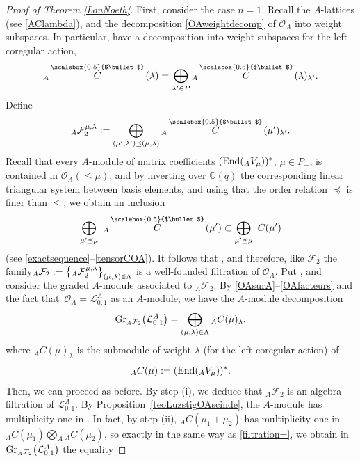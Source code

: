 \documentclass[pdftex]{sigma}
\numberwithin{equation}{section}
\theoremstyle{definition}
\newcommand{\mc}{\mathbb{C}}
\newcommand{\Ll}{{\mathcal L}}
\newcommand{\Oo}{{\mathcal O}}
\newcommand{\smallbullet}{%
\vcenter{\hbox{\,\scalebox{0.5}{$\bullet$}\,}}
}
\begin{document}
\begin{proof}[Proof of Theorem \ref{LonNoeth}]
First, consider the case $n=1$. Recall the $A$-lattices \smash{${}_A \overset{\raisebox{-1.5pt}{\scriptsize$\smallbullet$}}{C} (\lambda)$} (see \eqref{AClambda}), and the decomposition \eqref{OAweightdecomp} of $\Oo_A$ into weight subspaces. In particular, have a decomposition into weight subspaces for the left coregular action,
\[{}_A \overset{\raisebox{-1.5pt}{\scriptsize$\smallbullet$}}{C} (\lambda) = \bigoplus_{\lambda'\in P} {}_A \overset{\raisebox{-1.5pt}{\scriptsize$\smallbullet$}}{C} (\lambda)_{\lambda'}.\]
Define
\[{}_A\mathcal{F}_2^{\mu,\lambda} := \bigoplus_{(\mu',\lambda')\preceq (\mu,\lambda)} {}_A \overset{\raisebox{-1.5pt}{\scriptsize$\smallbullet$}}{C} (\mu')_{\lambda'}.\]
Recall that every $A$-module of matrix coefficients $({\rm End}({}_A V_\mu))^*$, $\mu\in P_+$, is contained in $\Oo_A(\leq \mu)$, and by inverting over $\mc(q)$ the corresponding linear triangular system between basis elements, and using that the order relation $\preceq$ is finer than $\leq$, we obtain an inclusion
\[
 \bigoplus_{\mu'\preceq \mu}\ {}_A \overset{\raisebox{-1.5pt}{\scriptsize$\smallbullet$}}{C} (\mu') \subset \bigoplus_{\mu'\preceq \mu} \ C(\mu')
\]
 (see \eqref{exactsequence}--\eqref{tensorCOA}). It follows that \smash{${}_A\mathcal{F}_2^{\mu,\lambda} = \mathcal{F}_2^{\mu,\lambda} \cap \Oo_A$}, and therefore, like $\mathcal{F}_2$ the family${}_A\mathcal{F}_2 :=\smash{\big\{{}_A\mathcal{F}_2^{\mu,\lambda}\big\}_{(\mu,\lambda)\in \Lambda}}$ is a well-founded filtration of $\Oo_A$. Put \smash{${}_A\mathcal{F}_2^{\prec \mu,\lambda} = \mathcal{F}_2^{\prec \mu,\lambda} \cap \Oo_A$}, and consider the graded $A$-module  associated to ${}_A\mathcal{F}_2$. By \eqref{OAsurA}--\eqref{OAfacteurs} and the fact that~${\Oo_A=\Ll_{0,1}^A}$ as an $A$-module, we have the $A$-module decomposition
\[{\rm Gr}_{ {}_A\mathcal{F}_2}\big({\mathcal L}_{0,1}^A\big)=\bigoplus_{(\mu,\lambda)\in \Lambda} {}_AC(\mu)_\lambda,\]
where ${}_AC(\mu)_\lambda$ is the submodule of weight $\lambda$ (for the left coregular action) of
\[{}_AC(\mu) := \left({\rm End}({}_A V_\mu\right))^*.\]
Then, we can proceed as before. By step (i), we deduce that ${}_A\mathcal{F}_2$ is an algebra filtration of $\Ll_{0,1}^A$. By Proposition~\ref{teoLuzstigOAscinde}, the $A$-module \smash{${}_A \overset{\raisebox{-1.5pt}{\scriptsize$\smallbullet$}}{C} (\mu_1+\mu_2)$} has multiplicity one in \smash{${}_A \overset{\raisebox{-1.5pt}{\scriptsize$\smallbullet$}}{C} (\mu_1)\otimes {}_A \overset{\raisebox{-1.5pt}{\scriptsize$\smallbullet$}}{C} (\mu_2)$}. In fact, by step (ii), ${}_AC(\mu_1+\mu_2)$ has multiplicity one in ${}_AC(\mu_1) \bigotimes_A {}_AC(\mu_2)$, so exactly in the same way as \eqref{filtration=}, we obtain in ${\rm Gr}_{ {}_A\mathcal{F}_2}\big({\mathcal L}_{0,1}^A\big)$ the equality

\end{proof}
\end{document}
